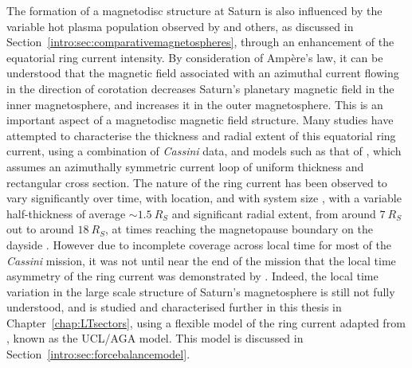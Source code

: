 The formation of a magnetodisc structure at Saturn is also influenced by the variable hot plasma population observed by \citet{sergis2010} and others, as discussed in Section~\ref{intro:sec:comparativemagnetospheres}, through an enhancement of the equatorial ring current intensity. By consideration of Amp\`ere's law, it can be understood that the magnetic field associated with an azimuthal current flowing in the direction of corotation decreases Saturn's planetary magnetic field in the inner magnetosphere, and increases it in the outer magnetosphere. This is an important aspect of a magnetodisc magnetic field structure. Many studies have attempted to characterise the thickness and radial extent of this equatorial ring current, using a combination of \textit{Cassini} data, and models such as that of \citet{connerney1981b, connerney1983}, which assumes an azimuthally symmetric current loop of uniform thickness and rectangular cross section. The nature of the ring current has been observed to vary significantly over time, with location, and with system size \citep[e.g.][]{bunce2007}, with a variable half-thickness of average ${\sim}\SI{1.5}{R_S}$ and significant radial extent, from around $\SI{7}{R_S}$ out to around $\SI{18}{R_S}$, at times reaching the magnetopause boundary on the dayside \citep[e.g.][]{kellett2009,sergis2009}. However due to incomplete coverage across local time for most of the \textit{Cassini} mission, it was not until near the end of the mission that the local time asymmetry of the ring current was demonstrated by \citet{sergis2017}. Indeed, the local time variation in the large scale structure of Saturn's magnetosphere is still not fully understood, and is studied and characterised further in this thesis in Chapter~\ref{chap:LTsectors}, using a flexible model of the ring current adapted from \citet{achilleos2010a},  known as the UCL/AGA model. This model is discussed in Section~\ref{intro:sec:forcebalancemodel}.

